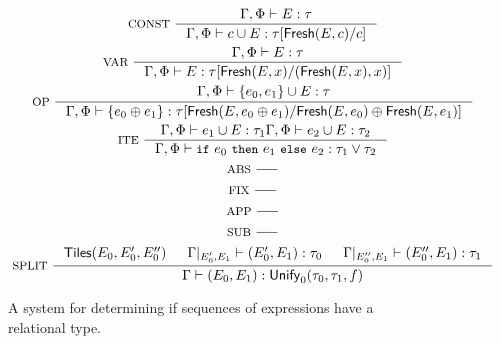 \begin{figure}
  \centering
  \begin{gather*}
    \inference[ CONST ]{ %
      \Gamma, \Phi \judges E : \tau }{ %
      \Gamma, \Phi \judges c \union E : %
      \replace{ \tau }{ c }{ \fresh(E, c) } } \\
    \inference[ VAR ]{ %
      \Gamma, \Phi \judges E : \tau }{ %
      \Gamma, \Phi \judges E : %
      \replace{ \tau }{ (\fresh(E, x), x) }{ \fresh(E, x) } } \\
    \inference[ OP ]{ 
      \Gamma, \Phi \judges \elts{ e_0, e_1 } \union E : \tau }{ %
      \Gamma, \Phi \judges \elts{ e_0 \oplus e_1 } : %
      \replace{ \tau }{ \fresh(E, e_0) \oplus \fresh(E, e_1) }{ %
        \fresh( E, e_0 \oplus e_1 ) } } \\
    \inference[ ITE ]{ %
      \Gamma, \Phi \judges e_1 \union E : \tau_1 %
      \Gamma, \Phi \judges e_2 \union E : \tau_2 }{ %
      \Gamma, \Phi \judges \ite{ e_0 }{ e_1 }{ e_2 } : %
      \tau_1 \lor \tau_2 } \\
    \inference[ ABS ]{ }{ } \\
    \inference[ FIX ]{ }{ } \\
    \inference[ APP ]{ }{ } \\
    \inference[ SUB ]{ %
    }{ %
    } \\
    \inference[ SPLIT ]{ 
      \tiles(E_0, E_0', E_0'') & %
      \restrict{ \Gamma }{ E_0', E_1 } \judges (E_0', E_1) : \tau_0 & %
      \restrict{ \Gamma }{ E_0'', E_1 } \judges (E_0'', E_1) : \tau_1 } %
    { \Gamma \judges (E_0, E_1) : \unify_0(\tau_0, \tau_1, f) } \\
  \end{gather*}
  \caption{A system for determining if sequences of expressions have
    a relational type.}
  \label{fig:reltypes-rules}
\end{figure}
%
%
%
